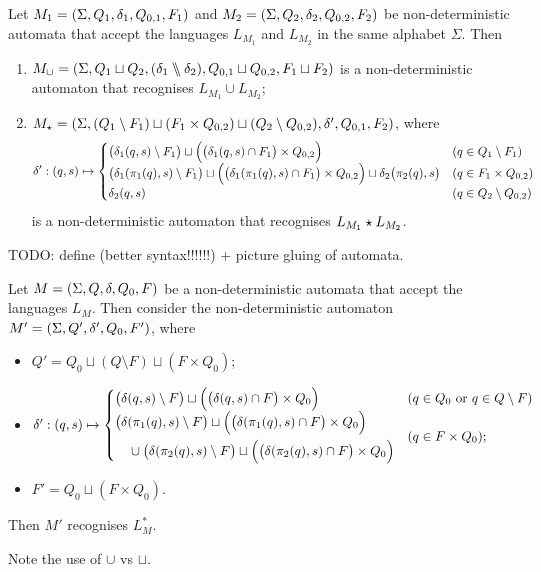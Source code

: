 \begin{proposition}
Let $M_1 = \sSet{\Sigma, Q_1, \delta_1, Q_{0,1}, F_1}$ and $M_2 = \sSet{\Sigma, Q_2, \delta_2, Q_{0,2}, F_2}$ be non-deterministic automata that accept the languages $L_{M_1}$ and $L_{M_2}$ in the same alphabet $\Sigma$.
Then
\begin{enumerate}
\item $M_{\cup} = \sSet{\Sigma, Q_1\sqcup Q_2, (\delta_1 \bbslash \delta_2), Q_{0,1}\sqcup Q_{0,2}, F_1 \sqcup F_2}$ is a non-deterministic automaton that recognises $L_{M_1}\cup L_{M_2}$;
\item $M_\star = \sSet{\Sigma, (Q_1\setminus F_1) \sqcup (F_1\times Q_{0,2}) \sqcup (Q_2\setminus Q_{0,2}), \delta', Q_{0,1}, F_2}$, where
\[ \delta': (q,s)\mapsto \begin{cases}
\big(\delta_1(q,s)\setminus F_1\big) \sqcup \Big(\big(\delta_1(q,s)\cap F_1\big)\times Q_{0,2}\Big) & (q\in Q_1\setminus F_1) \\
\big(\delta_1(\pi_1(q),s)\setminus F_1\big) \sqcup \Big(\big(\delta_1(\pi_1(q),s)\cap F_1\big)\times Q_{0,2}\Big) \sqcup \delta_2\big(\pi_2(q), s\big) & (q\in F_1\times Q_{0,2}) \\
\delta_2(q,s) & (q\in Q_2\setminus Q_{0,2})
\end{cases} \]
is a non-deterministic automaton that recognises $L_{M_1}\star L_{M_2}$.
\end{enumerate}
\end{proposition}

TODO: define (better syntax!!!!!!) + picture gluing of automata.

\begin{proposition}
Let $M = \sSet{\Sigma, Q, \delta, Q_{0}, F}$ be a non-deterministic automata that accept the languages $L_{M}$.
Then consider the non-deterministic automaton $M' = \sSet{\Sigma, Q', \delta', Q_{0}, F'}$, where
\begin{itemize}
\item $Q' = Q_0 \sqcup (Q\setminus F) \sqcup (F\times Q_0)$;
\item $\delta': (q,s) \mapsto \begin{cases}
\big(\delta(q,s)\setminus F\big) \sqcup \Big(\big(\delta(q,s)\cap F\big) \times Q_0\Big) & (\text{$q\in Q_0$ or $q\in Q\setminus F$}) \\
\begin{multlined}\big(\delta(\proj_1(q),s)\setminus F\big) \sqcup \Big(\big(\delta(\proj_1(q),s)\cap F\big) \times Q_0\Big) \vspace{-1em} \\ \cup \big(\delta(\proj_2(q),s)\setminus F\big) \sqcup \Big(\big(\delta(\proj_2(q),s)\cap F\big) \times Q_0\Big) \end{multlined}& (q\in F\times Q_0);
\end{cases}$
\item $F' = Q_0 \sqcup (F\times Q_0)$.
\end{itemize}
Then $M'$ recognises $L_{M}^*$.
\end{proposition}
Note the use of $\cup$ vs $\sqcup$.



